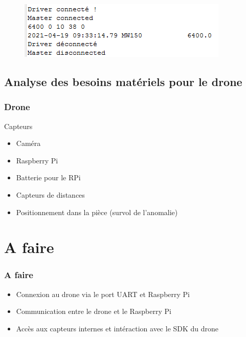 \documentclass[12pt]{beamer}
\begin{document}
\begin{frame}[allowframebreaks]
		\begin{figure}[H]
			\centering
			\includegraphics[scale=0.3]{test5.png}
			\label{fig:test5}
		\end{figure}
	\end{frame}
	
	\subsection{Analyse des besoins matériels pour le drone}
	\begin{frame}[allowframebreaks]
	\frametitle{Drone}
		\begin{block}{Capteurs}
				\begin{itemize}
					[square]
					\item Caméra
					\item Raspberry Pi
					\item Batterie pour le RPi
					\item Capteurs de distances
					\item Positionnement dans la pièce (survol de l'anomalie)
				\end{itemize}
		\end{block}
	\end{frame}
	
	\section{A faire}
	\begin{frame}[allowframebreaks]
	\frametitle{A faire}
		\begin{alertblock}{}
				\begin{itemize}
					[triangle]
					\item Connexion au drone via le port UART et Raspberry Pi
					\item Communication entre le drone et le Raspberry Pi
					\item Accès aux capteurs internes et intéraction avec le SDK du drone
				\end{itemize}
		\end{alertblock}
	\end{frame}
	
\end{document}
